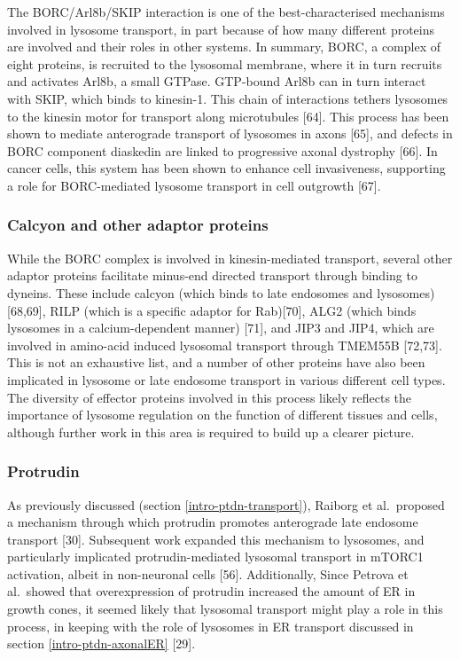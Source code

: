 \documentclass[
  12pt,
  a4paper,
]{book}
\begin{document}
The BORC/Arl8b/SKIP interaction is one of the best-characterised mechanisms involved in lysosome transport, in part because of how many different proteins are involved and their roles in other systems. In summary, BORC, a complex of eight proteins, is recruited to the lysosomal membrane, where it in turn recruits and activates Arl8b, a small GTPase. GTP-bound Arl8b can in turn interact with SKIP, which binds to kinesin-1. This chain of interactions tethers lysosomes to the kinesin motor for transport along microtubules {[}64{]}. This process has been shown to mediate anterograde transport of lysosomes in axons {[}65{]}, and defects in BORC component diaskedin are linked to progressive axonal dystrophy {[}66{]}. In cancer cells, this system has been shown to enhance cell invasiveness, supporting a role for BORC-mediated lysosome transport in cell outgrowth {[}67{]}.

\hypertarget{calcyon-and-other-adaptor-proteins}{%
\subsubsection{Calcyon and other adaptor proteins}\label{calcyon-and-other-adaptor-proteins}}

While the BORC complex is involved in kinesin-mediated transport, several other adaptor proteins facilitate minus-end directed transport through binding to dyneins. These include calcyon (which binds to late endosomes and lysosomes){[}68,69{]}, RILP (which is a specific adaptor for Rab){[}70{]}, ALG2 (which binds lysosomes in a calcium-dependent manner) {[}71{]}, and JIP3 and JIP4, which are involved in amino-acid induced lysosomal transport through TMEM55B {[}72,73{]}. This is not an exhaustive list, and a number of other proteins have also been implicated in lysosome or late endosome transport in various different cell types. The diversity of effector proteins involved in this process likely reflects the importance of lysosome regulation on the function of different tissues and cells, although further work in this area is required to build up a clearer picture.

\hypertarget{protrudin-1}{%
\subsubsection{Protrudin}\label{protrudin-1}}

As previously discussed (section \ref{intro-ptdn-transport}), Raiborg et al.~proposed a mechanism through which protrudin promotes anterograde late endosome transport {[}30{]}. Subsequent work expanded this mechanism to lysosomes, and particularly implicated protrudin-mediated lysosomal transport in mTORC1 activation, albeit in non-neuronal cells {[}56{]}. Additionally, Since Petrova et al.~showed that overexpression of protrudin increased the amount of ER in growth cones, it seemed likely that lysosomal transport might play a role in this process, in keeping with the role of lysosomes in ER transport discussed in section \ref{intro-ptdn-axonalER} {[}29{]}.
\end{document}
